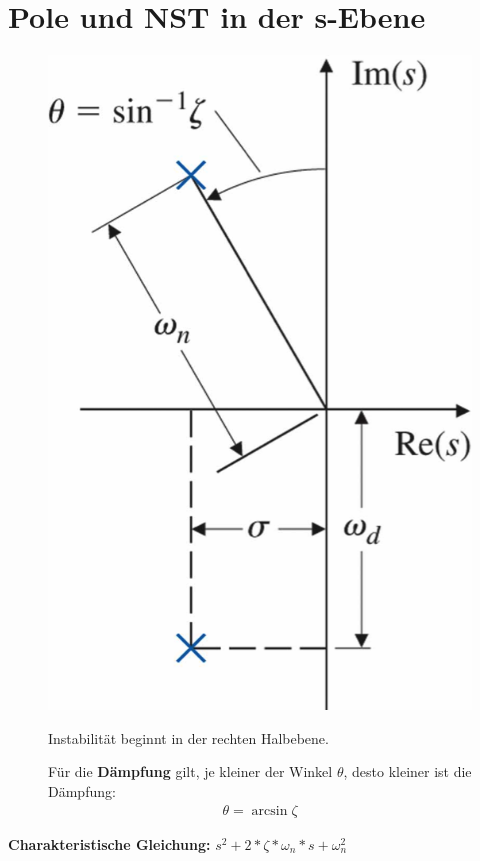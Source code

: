 \section{Pole und NST in der s-Ebene}
\begin{tcolorbox}[colback=white!10!white,colframe=green!30!black,title=PT$_2$ - Glied] 
    \begin{figure}[H]
        \begin{minipage}{.3\textwidth}
            \centering
            \includegraphics[width=1\textwidth]{content/img/winkel}
        \end{minipage}%
        \hspace{1cm}
        \begin{minipage}{.6\textwidth}
            Instabilität beginnt in der rechten Halbebene. 
            
            Für die  \textbf{Dämpfung} gilt, je kleiner der Winkel $\theta$, desto kleiner ist die Dämpfung: \begin{align*}
                \theta = \arcsin{\zeta}
            \end{align*}
        \end{minipage}%
        
    \end{figure}
    \textbf{Charakteristische Gleichung:} $s^2+2*\zeta*\omega_n*s+\omega_n^2$
\end{tcolorbox}

